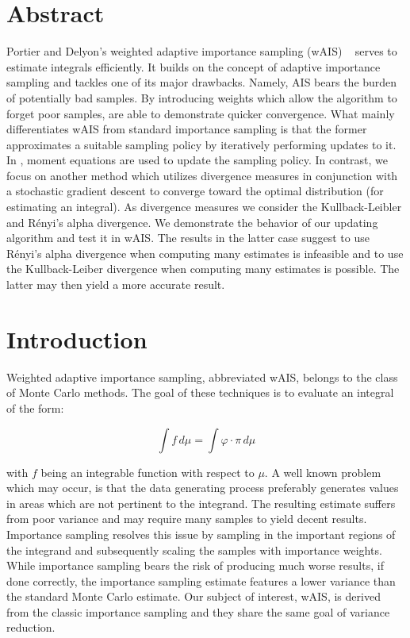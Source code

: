 

\begin{multicols}{2}
\section*{Abstract}

Portier and Delyon's weighted adaptive importance sampling (wAIS) ~\cite{portierdelyonWAIS} serves to estimate integrals efficiently. It builds on the concept of adaptive importance sampling and tackles one of its major drawbacks. Namely, AIS bears the burden of potentially bad samples. By introducing weights which allow the algorithm to forget poor samples, \cite{portierdelyonWAIS} are able to demonstrate quicker convergence. What mainly differentiates wAIS from standard importance sampling is that the former approximates a suitable sampling policy by iteratively performing updates to it. In \cite{portierdelyonWAIS}, moment equations are used to update the sampling policy. In contrast, we focus on another method which utilizes divergence measures in conjunction with a stochastic gradient descent to converge toward the optimal distribution (for estimating an integral). As divergence measures we consider the Kullback-Leibler and Rényi's alpha divergence. We demonstrate the behavior of our updating algorithm and test it in wAIS. The results in the latter case suggest to use Rényi's alpha divergence when computing many estimates is infeasible and to use the Kullback-Leiber divergence when computing many estimates is possible. The latter may then yield a more accurate result.

\section{Introduction}

Weighted adaptive importance sampling, abbreviated wAIS, belongs to the class of Monte Carlo methods. The goal of these techniques is to evaluate an integral of the form: 

$$\displaystyle \int f \, d\mu = \int \varphi \cdot \pi \, d\mu$$

with $f$ being an integrable function with respect to $\mu$. 
A well known problem which may occur, is that the data generating process preferably generates values in areas which are not pertinent to the integrand. The resulting estimate suffers from poor variance and may require many samples to yield decent results. Importance sampling resolves this issue by sampling in the important regions of the integrand and subsequently scaling the samples with importance weights. While importance sampling bears the risk of producing much worse results, if done correctly, the importance sampling estimate features a lower variance than the standard Monte Carlo estimate. 
Our subject of interest, wAIS, is derived from the classic importance sampling and they share the same goal of variance reduction. 


\end{multicols}
